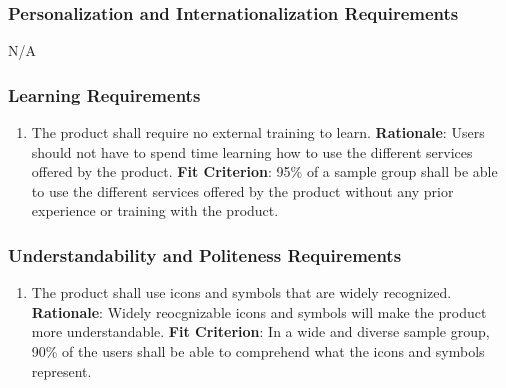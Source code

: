 \documentclass[12pt]{article}
\begin{document}
\subsubsection{Personalization and Internationalization Requirements}
N/A

\subsubsection{Learning Requirements}
\begin{enumerate}[nfr]
    \item The product shall require no external training to learn.
    \newline \textbf{Rationale}: Users should not have to spend time learning how to use the different services offered by the product.
    \newline \textbf{Fit Criterion}: 95\% of a sample group shall be able to use the different services offered by the product without any prior experience or training with the product.
\end{enumerate}

\subsubsection{Understandability and Politeness Requirements}
\begin{enumerate}[nfr]
    \item The product shall use icons and symbols that are widely recognized.
    \newline \textbf{Rationale}: Widely reocgnizable icons and symbols will make the product more understandable.
    \newline \textbf{Fit Criterion}: In a wide and diverse sample group, 90\% of the users shall be able to comprehend what the icons and symbols represent.
\end{enumerate}
\end{document}
